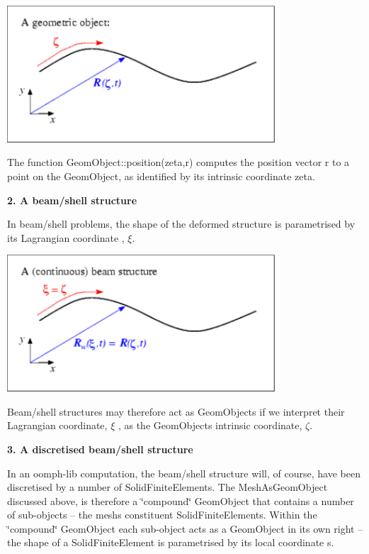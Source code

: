  
\begin{DoxyImage}
\includegraphics[width=0.75\textwidth]{wall_mesh_geometry_sketch1}
\end{DoxyImage}


The function {\ttfamily Geom\+Object\+::position(zeta,r)} computes the position vector {\ttfamily r} to a point on the {\ttfamily Geom\+Object}, as identified by its intrinsic coordinate {\ttfamily zeta}.

{\bfseries 2. A beam/shell structure}

In beam/shell problems, the shape of the deformed structure is parametrised by its Lagrangian coordinate , $\xi. $

 
\begin{DoxyImage}
\includegraphics[width=0.75\textwidth]{wall_mesh_geometry_sketch2}
\end{DoxyImage}


Beam/shell structures may therefore act as {\ttfamily Geom\+Objects} if we interpret their Lagrangian coordinate, $ \xi $ , as the {\ttfamily Geom\+Object\textquotesingle{}s} intrinsic coordinate, $ \zeta $.

{\bfseries 3. A discretised beam/shell structure}

In an {\ttfamily oomph-\/lib} computation, the beam/shell structure will, of course, have been discretised by a number of {\ttfamily Solid\+Finite\+Elements}. The {\ttfamily Mesh\+As\+Geom\+Object} discussed above, is therefore a \char`\"{}compound\char`\"{} {\ttfamily Geom\+Object} that contains a number of sub-\/objects -- the mesh\textquotesingle{}s constituent {\ttfamily Solid\+Finite\+Elements}. Within the \char`\"{}compound\char`\"{} {\ttfamily Geom\+Object} each sub-\/object acts as a {\ttfamily Geom\+Object} in its own right -- the shape of a {\ttfamily Solid\+Finite\+Element} is parametrised by its local coordinate {\ttfamily s}.

